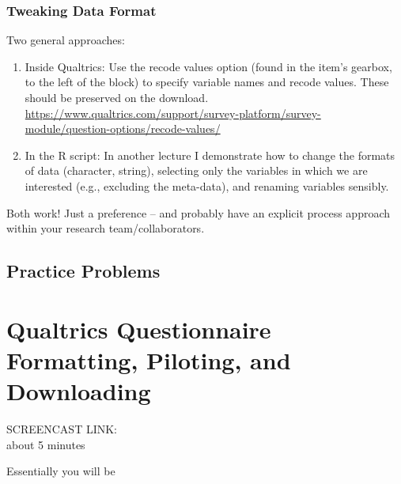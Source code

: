 \documentclass[
  english,
]{book}
\begin{document}
\hypertarget{tweaking-data-format}{%
\subsection{Tweaking Data Format}\label{tweaking-data-format}}

Two general approaches:

\begin{enumerate}
\def\labelenumi{\arabic{enumi}.}
\item
  Inside Qualtrics: Use the recode values option (found in the item's gearbox, to the left of the block) to specify variable names and recode values. These should be preserved on the download. \url{https://www.qualtrics.com/support/survey-platform/survey-module/question-options/recode-values/}
\item
  In the R script: In another lecture I demonstrate how to change the formats of data (character, string), selecting only the variables in which we are interested (e.g., excluding the meta-data), and renaming variables sensibly.
\end{enumerate}

Both work! Just a preference -- and probably have an explicit process approach within your research team/collaborators.

\hypertarget{practice-problems-1}{%
\section{Practice Problems}\label{practice-problems-1}}

\hypertarget{qualtrics-questionnaire-formatting-piloting-and-downloading}{%
\chapter{Qualtrics Questionnaire Formatting, Piloting, and Downloading}\label{qualtrics-questionnaire-formatting-piloting-and-downloading}}

SCREENCAST LINK:\\
about 5 minutes

Essentially you will be
\end{document}
